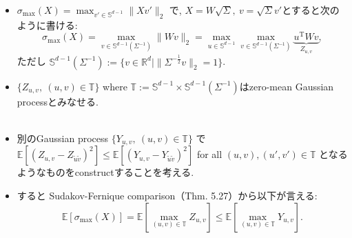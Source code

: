 \documentclass[unicode,aspectratio=169,11pt]{beamer}
\newcommand{\ex}{\mathbb{E}}
\newcommand{\bb}{\mathbb}
\newcommand{\tr}{\mathrm{T}}
\begin{document}
\begin{frame}
  \begin{itemize}
    \item $\sigma_{\max}(X) = \max_{v' \in \bb{S}^{d-1}}\|Xv'\|_2$ で, $X = W\sqrt{\Sigma},\ v = \sqrt{\Sigma}v'$とすると次のように書ける:
          \[
            \sigma_{\max}(X) = \max_{v \in \bb{S}^{d-1}(\Sigma^{-1})} \|W v\|_2
            = \max_{u \in \bb{S}^{d-1}} \max_{v \in \bb{S}^{d-1}(\Sigma^{-1})} \underbrace{u^\tr W v}_{Z_{u,v}},
          \]
          ただし $\bb{S}^{d-1}(\Sigma^{-1}) := \{v \in \bb{R}^d \mid \|\Sigma^{-\frac{1}{2}}v\|_2 = 1\}$.
    \item $\{ Z_{u, v} ,\ (u, v) \in \bb{T}\}$ where $\bb{T} := \bb{S}^{d-1}\times \bb{S}^{d-1}(\Sigma^{-1})$はzero-mean Gaussian processとみなせる.\\
    　\\
    \item 別のGaussian process $\{Y_{u,v},\ (u,v)\in \bb{T}\}$ で $\ex[(Z_{u,v}-Z_{\tilde{u}\tilde{v}})^2] \le \ex[(Y_{u,v}-Y_{\tilde{u}\tilde{v}})^2]$
          for all $(u,v), (u',v') \in \bb{T}$ となるようなものをconstructすることを考える.
    \item すると Sudakov-Fernique comparison（Thm. 5.27）から以下が言える:
          \[ \ex[\sigma_{\max}(X)] = \ex\left[\max_{(u,v)\in \bb{T}} Z_{u,v}\right] \le \ex\left[\max_{(u,v)\in \bb{T}} Y_{u,v}\right]. \tag{6.17}\]
  \end{itemize}
\end{frame}
\end{document}
